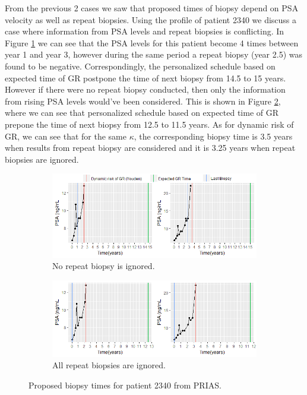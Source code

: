 From the previous 2 cases we saw that proposed times of biopsy depend on PSA velocity as well as repeat biopsies. Using the profile of patient 2340 we discuss a case where information from PSA levels and repeat biopsies is conflicting. In Figure \ref{fig : prias_demo_pid_2340_yes_biopsy} we can see that the PSA levels for this patient become 4 times between year 1 and year 3, however during the same period a repeat biopsy (year 2.5) was found to be negative. Correspondingly, the personalized schedule based on expected time of GR postpone the time of next biopsy from 14.5 to 15 years. However if there were no repeat biopsy conducted, then only the information from rising PSA levels would've been considered. This is shown in Figure \ref{fig : prias_demo_pid_2340_no_biopsy}, where we can see that personalized schedule based on expected time of GR prepone the time of next biopsy from 12.5 to 11.5 years. As for dynamic risk of GR, we can see that for the same $\kappa$, the corresponding biopsy time is 3.5 years when results from repeat biopsy are considered and it is 3.25 years when repeat biopsies are ignored.

\begin{figure}[!htb]
    \centering
    \captionsetup{justification=centering}
     \begin{subfigure}[b]{\textwidth}
        \includegraphics[width=\textwidth]{images/prias_demo/case_2340_yesbiopsy.png}
        \caption{No repeat biopsy is ignored.}
        \label{fig : prias_demo_pid_2340_yes_biopsy}
    \end{subfigure}
    \begin{subfigure}[b]{\textwidth}
        \includegraphics[width=\textwidth]{images/prias_demo/case_2340_nobiopsy.png}
        \caption{All repeat biopsies are ignored.}
        \label{fig : prias_demo_pid_2340_no_biopsy}
    \end{subfigure}
    \label{fig : prias_demo_pid_2340}
    \caption{Proposed biopsy times for patient 2340 from PRIAS.}
\end{figure}